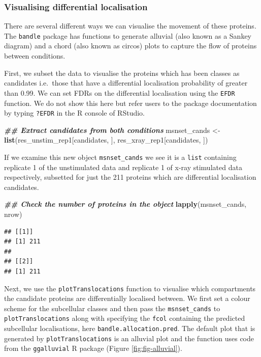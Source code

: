 \documentclass[9pt,a4paper,]{extarticle}
\newenvironment{Shaded}{\begin{snugshade}}{\end{snugshade}}
\newcommand{\DocumentationTok}[1]{\textcolor[rgb]{0.56,0.35,0.01}{\textbf{\textit{#1}}}}
\newcommand{\FunctionTok}[1]{\textcolor[rgb]{0.13,0.29,0.53}{\textbf{#1}}}
\newcommand{\NormalTok}[1]{#1}
\newcommand{\OtherTok}[1]{\textcolor[rgb]{0.56,0.35,0.01}{#1}}
\begin{document}
\subsubsection{Visualising differential localisation}\label{visualising-differential-localisation}

There are several different ways we can visualise the movement of these
proteins. The \texttt{bandle} package has functions to generate alluvial (also known as
a Sankey diagram) and a chord (also known as circos) plots to capture the flow
of proteins between conditions.

First, we subset the data to visualise the proteins which has been classes as
candidates i.e.~those that have a differential localisation probability of
greater than 0.99. We can set FDRs on the differential localisation using the
\texttt{EFDR} function. We do not show this here but refer users to the package
documentation by typing \texttt{?EFDR} in the R console of RStudio.

\begin{Shaded}
\begin{Highlighting}[]
\DocumentationTok{\#\# Extract candidates from both conditions}
\NormalTok{msnset\_cands }\OtherTok{\textless{}{-}} \FunctionTok{list}\NormalTok{(res\_unstim\_rep1[candidates, ],}
\NormalTok{                     res\_xray\_rep1[candidates, ])}
\end{Highlighting}
\end{Shaded}

If we examine this new object \texttt{msnset\_cands} we see it is a \texttt{list} containing
replicate 1 of the unstimulated data and replicate 1 of x-ray stimulated data
respectively, subsetted for just the 211 proteins which
are differential localisation candidates.

\begin{Shaded}
\begin{Highlighting}[]
\DocumentationTok{\#\# Check the number of proteins in the object}
\FunctionTok{lapply}\NormalTok{(msnset\_cands, nrow)}
\end{Highlighting}
\end{Shaded}

\begin{verbatim}
## [[1]]
## [1] 211
## 
## [[2]]
## [1] 211
\end{verbatim}

Next, we use the \texttt{plotTranslocations} function to visualise which compartments
the candidate proteins are differentially localised between. We first set a colour
scheme for the subcellular classes and then pass the \texttt{msnset\_cands} to
\texttt{plotTranslocations} along with specifying the \texttt{fcol} containing the predicted
subcellular localisations, here \texttt{bandle.allocation.pred}. The default plot that is
generated by \texttt{plotTranslocations} is an alluvial plot and the function uses code
from the \texttt{ggalluvial} R package (Figure \ref{fig:fig-alluvial}).
\end{document}
